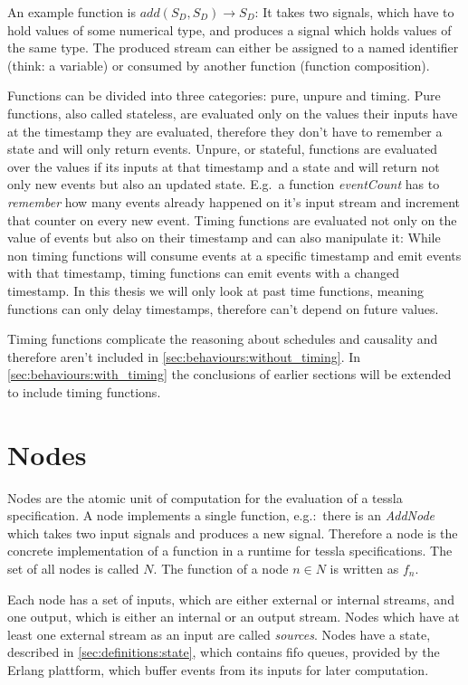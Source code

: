An example function is \(\mathit{add}(S_D,S_D) \rightarrow S_D\): It takes two signals, which have to hold values of some numerical type, and produces a signal which holds values of the same type.
The produced stream can either be assigned to a named identifier (think: a variable) or consumed by another function (function composition).

Functions can be divided into three categories: pure, unpure and timing.
Pure functions, also called stateless, are evaluated only on the values their inputs have at the timestamp they are evaluated, therefore they don't have to remember a state and will only return events.
Unpure, or stateful, functions are evaluated over the values if its inputs at that timestamp and a state and will return not only new events but also an updated state.
E.g.\ a function \emph{eventCount} has to \emph{remember} how many events already happened on it's input stream and increment that counter on every new event.
Timing functions are evaluated not only on the value of events but also on their timestamp and can also manipulate it:
While non timing functions will consume events at a specific timestamp and emit events with that timestamp, timing functions can emit events with a changed timestamp.
In this thesis we will only look at past time functions, meaning functions can only delay timestamps, therefore can't depend on future values.

Timing functions complicate the reasoning about schedules and causality and therefore aren't included in \cref{sec:behaviours:without_timing}.
In \cref{sec:behaviours:with_timing} the conclusions of earlier sections will be extended to include timing functions.

\section{Nodes}
\label{sec:definitions:nodes}

Nodes are the atomic unit of computation for the evaluation of a \gls{tessla} specification.
A node implements a single function, e.g.:\ there is an \emph{AddNode} which takes two input signals and produces a new signal.
Therefore a node is the concrete implementation of a function in a runtime for \gls{tessla} specifications.
The set of all nodes is called \(N\).
The function of a node \(n \in N\) is written as \(f_n\).

Each node has a set of inputs, which are either external or internal streams, and one output, which is either an internal or an output stream.
Nodes which have at least one external stream as an input are called \emph{sources}.
Nodes have a state, described in \cref{sec:definitions:state}, which contains \gls{fifo} queues, provided by the Erlang plattform, which buffer events from its inputs for later computation.

